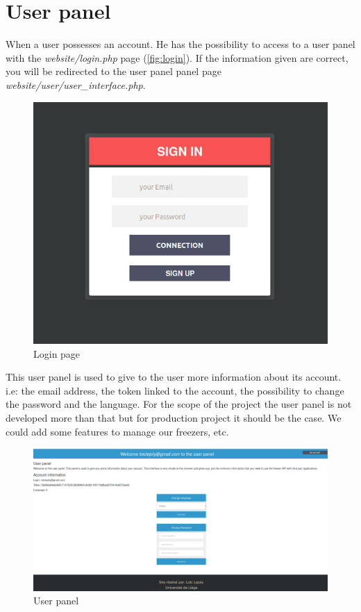 \section{User panel}
When a user possesses an account. He has the possibility to access to a user panel with the \textit{website/login.php} page (\autoref{fig:login}). If the information given are correct, you will be redirected to the user panel panel page \textit{website/user/user\_interface.php}.
\begin{figure}[H]
\centering
\includegraphics[scale=0.4]{./images/login.png}
\caption{Login page}
\label{fig:login}
\end{figure}

This user panel is used to give to the user more information about its account. i.e: the email address, the token linked to the account, the possibility to change the password and the language. For the scope of the project the user panel is not developed more than that but for production project it should be the case. We could add some features to manage our freezers, etc.

\begin{figure}[H]
\centering
\includegraphics[scale=0.25]{./images/userPanel.png}
\caption{User panel}
\label{fig:login}
\end{figure}

